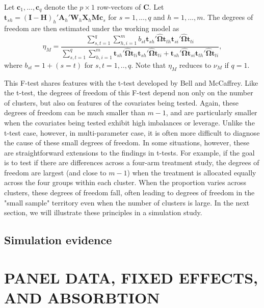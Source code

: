 \documentclass[12pt]{article}
\newcommand{\bm}{\mathbf}
\newcommand{\bs}{\boldsymbol}
\begin{document}
Let $\bm{c}_1,...,\bm{c}_q$ denote the $p \times 1$ row-vectors of $\bm{C}$. 
Let $\bm{t}_{sh} = \left(\bm{I} - \bm{H}\right)_h'\bm{A}_h'\bm{W}_h\bm{X}_h\bm{M}\bm{c}_s$ for $s = 1,...,q$ and $h = 1,...,m$. 
The degrees of freedom are then estimated under the working model as
\begin{equation}
\label{eq:eta_model}
\eta_M = \frac{\sum_{s,t=1}^q \sum_{h,i=1}^m b_{st} \bm{t}_{sh}'\hat{\bs\Omega}\bm{t}_{th} \bm{t}_{si}'\hat{\bs\Omega}\bm{t}_{ti}}{\sum_{s,t=1}^q \sum_{h,i=1}^m \bm{t}_{sh}'\hat{\bs\Omega}\bm{t}_{ti} \bm{t}_{sh}'\hat{\bs\Omega}\bm{t}_{ti} + \bm{t}_{sh}'\hat{\bs\Omega}\bm{t}_{si} \bm{t}_{th}'\hat{\bs\Omega}\bm{t}_{ti}},
\end{equation}
where $b_{st} = 1 + (s=t)$ for $s,t=1,..,q$.
Note that $\eta_M$ reduces to $\nu_M$ if $q = 1$.

This F-test shares features with the t-test developed by Bell and McCaffrey. Like the t-test, the degrees of freedom of this F-test depend non only on the number of clusters, but also on features of the covariates being tested. Again, these degrees of freedom can be much smaller than $m - 1$, and are particularly smaller when the covariates being tested exhibit high imbalances or leverage. Unlike the t-test case, however, in multi-parameter case, it is often more difficult to diagnose the cause of these small degrees of freedom. In some situations, however, these are straightforward extensions to the findings in t-tests. For example, if the goal is to test if there are differences across a four-arm treatment study, the degrees of freedom are largest (and close to $m - 1$) when the treatment is allocated equally across the four groups within each cluster. When the proportion varies across clusters, these degrees of freedom fall, often leading to degrees of freedom in the "small sample" territory even when the number of clusters is large. In the next section, we will illustrate these principles in a simulation study.


\subsection{Simulation evidence}
\label{subsec:simulation_F}


\section{PANEL DATA, FIXED EFFECTS, AND ABSORBTION}

\end{document}
